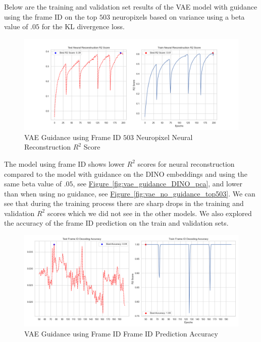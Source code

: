 \documentclass[12pt, letterpaper]{article}
\begin{document}
Below are the training and validation set results of the VAE model with guidance using the frame ID on the top $503$ neuropixels based on variance using a beta value of $.05$ for the KL divergence loss.

\begin{figure}[H]
    \centering
    \includegraphics[width=1.0\textwidth]{x_r2_128dim_503_top_var_200_epochs_0.05_beta_2_layer_frame_id_guidance.png}
    \caption{VAE Guidance using Frame ID $503$ Neuropixel Neural Reconstruction $R^2$ Score}
    \label{fig:vae_guidance_frame_id}
\end{figure}

The model using frame ID shows lower $R^2$ scores for neural reconstruction compared to the model with guidance on the DINO \cite{dino} embeddings and using the same beta value of $.05$, see \hyperref[fig:vae_guidance_DINO_pca]{Figure~\ref{fig:vae_guidance_DINO_pca}}, and lower than when using no guidance, see \hyperref[fig:vae_no_guidance_top503]{Figure~\ref{fig:vae_no_guidance_top503}}. We can see that during the training process there are sharp drops in the training and validation $R^2$ scores which we did not see in the other models. We also explored the accuracy of the frame ID prediction on the train and validation sets.

\begin{figure}[H]
    \centering
    \includegraphics[width=1.0\textwidth]{frame_id_accuracy_128dim_503_top_var_200_epochs_0.05_beta_2_layer.png}
    \caption{VAE Guidance using Frame ID Frame ID Prediction Accuracy}
    \label{fig:vae_guidance_frame_id_accuracy}
\end{figure}
\end{document}
